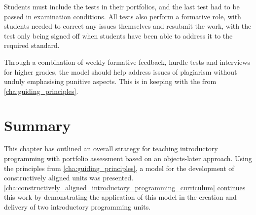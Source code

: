 Students must include the tests in their portfolios, and the last test had to be passed in examination conditions. All tests also perform a formative role, with students needed to correct any issues themselves and resubmit the work, with the test only being signed off when students have been able to address it to the required standard.

Through a combination of weekly formative feedback, hurdle tests and interviews for higher grades, the model should help address issues of plagiarism without unduly emphasising punitive aspects. This is in keeping with the  from \cref{cha:guiding_principles}.


\section{Summary} %
\label{sec:summary}

This chapter has outlined an overall strategy for teaching introductory programming with portfolio assessment based on an objects-later approach. Using the principles from \cref{cha:guiding_principles}, a model for the development of constructively aligned units was presented. \cref{cha:constructively_aligned_introductory_programming_curriculum} continues this work by demonstrating the application of this model in the creation and delivery of two introductory programming units.


